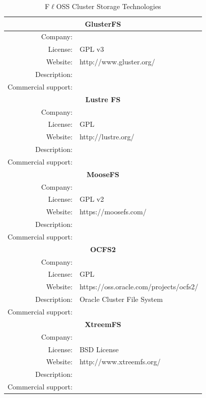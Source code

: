 \documentclass[a4paper, 12pt]{book}
\begin{document}
\FloatBarrier
\begin{table}[H]
  \centering
  \begin{tabular}{ | r m{10cm} | }

    \hline
    \multicolumn{2}{|c|}{\textbf{GlusterFS}}\\
    \hline
    Company: &  \\
    License: & GPL v3 \\
    Website: & http://www.gluster.org/ \\
    Description: &  \\
    Commercial support: &  \\
    
    \hline
    \multicolumn{2}{|c|}{\textbf{Lustre FS}}\\
    \hline
    Company: &  \\
    License: & GPL \\
    Website: & http://lustre.org/ \\
    Description: &  \\
    Commercial support: &  \\
    
    \hline    
    \multicolumn{2}{|c|}{\textbf{MooseFS}}\\
    \hline
    Company: &  \\
    License: & GPL v2 \\
    Website: & https://moosefs.com/ \\
    Description: &  \\
    Commercial support: &  \\

    \hline    
    \multicolumn{2}{|c|}{\textbf{OCFS2}}\\
    \hline
    Company: &  \\
    License: & GPL \\
    Website: & https://oss.oracle.com/projects/ocfs2/ \\
    Description: & Oracle Cluster File System \\
    Commercial support: &  \\
    
    \hline    
    \multicolumn{2}{|c|}{\textbf{XtreemFS}}\\
    \hline
    Company: &  \\
    License: & BSD License \\
    Website: & http://www.xtreemfs.org/ \\
    Description: &  \\
    Commercial support: &  \\
    \hline    
    
  \end{tabular}
\caption{F$\ell$OSS Cluster Storage Technologies}
\label{table:cluster_filesystems}
\end{table}
\end{document}
